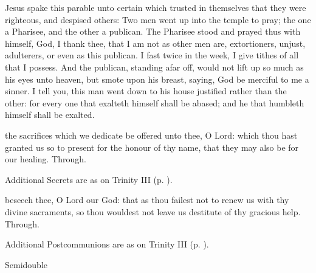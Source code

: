 \vspace{-0.5ex}
 Jesus spake this parable unto certain which trusted in themselves that they were righteous, and despised others: Two men went up into the temple to pray; the one a Pharisee, and the other a publican. The Pharisee stood and prayed thus with himself, God, I thank thee, that I am not as other men are, extortioners, unjust, adulterers, or even as this publican. I fast twice in the week, I give tithes of all that I possess. And the publican, standing afar off, would not lift up so much as his eyes unto heaven, but smote upon his breast, saying, God be merciful to me a sinner. I tell you, this man went down to his house justified rather than the other: for every one that exalteth himself shall be abased; and he that humbleth himself shall be exalted.


\vspace{-0.5ex}
\secret
{} the sacrifices which we dedicate be offered unto thee, O Lord: which thou hast granted us so to present for the honour of thy name, that they may also be for our healing. Through.
\begin{rubric}
    Additional Secrets are as on Trinity III (p. \pageref{TrinityIII}).
\end{rubric}


\postcommunion
{} beseech thee, O Lord our God: that as thou failest not to renew us with thy divine sacraments, so thou wouldest not leave us destitute of thy gracious help. Through.
\begin{rubric}
    Additional Postcommunions are as on Trinity III (p. \pageref{TrinityIII}).
\end{rubric}

\begin{inhead}
{Semidouble}
\end{inhead}
\par\noindent
{}

